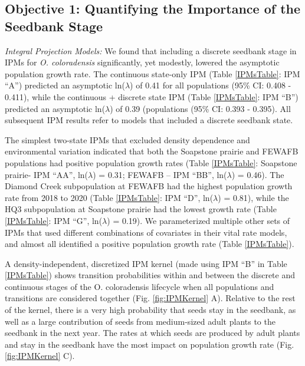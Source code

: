 \documentclass[12pt, letterpaper]{article}
\begin{document}
\subsection{Objective 1: Quantifying the Importance of the Seedbank Stage}

\textit{Integral Projection Models:} We found that including a discrete seedbank stage in IPMs for \textit{O. coloradensis} significantly, yet modestly, lowered the asymptotic population growth rate. The continuous state-only IPM (Table \ref{IPMsTable}: IPM “A”) predicted an asymptotic ln($\lambda$) of 0.41 for all populations (95\% CI: 0.408 - 0.411), while the continuous + discrete state IPM (Table \ref{IPMsTable}: IPM “B”) predicted an asymptotic ln($\lambda$) of 0.39 (populations (95\% CI: 0.393 - 0.395). All subsequent IPM results refer to models that included a discrete seedbank state. 

The simplest two-state IPMs that excluded density dependence and environmental variation indicated that both the Soapstone prairie and FEWAFB populations had positive population growth rates (Table \ref{IPMsTable}: Soapstone prairie- IPM “AA”, ln($\lambda$) = 0.31;  FEWAFB – IPM “BB”, ln($\lambda$) =  0.46). The Diamond Creek subpopulation at FEWAFB had the highest population growth rate from 2018 to 2020 (Table \ref{IPMsTable}: IPM “D”, ln($\lambda$) = 0.81), while the HQ3 subpopulation at Soapstone prairie had the lowest growth rate (Table \ref{IPMsTable}: IPM “G”, ln($\lambda$) = 0.19). We parameterized multiple other sets of IPMs that used different combinations of covariates in their vital rate models, and almost all identified a positive population growth rate (Table \ref{IPMsTable}).   

A density-independent, discretized IPM kernel (made using IPM “B” in Table \ref{IPMsTable}) shows transition probabilities within and between the discrete and continuous stages of the O. coloradensis lifecycle when all populations and transitions are considered together (Fig. \ref{fig:IPMKernel} A). Relative to the rest of the kernel, there is a very high probability that seeds stay in the seedbank, as well as a large contribution of seeds from medium-sized adult plants to the seedbank in the next year. The rates at which seeds are produced by adult plants and stay in the seedbank have the most impact on population growth rate (Fig. \ref{fig:IPMKernel} C).
\end{document}
